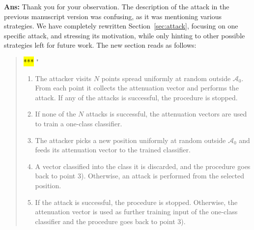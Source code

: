\documentclass[draftcls,onecolumn,12pt]{IEEEtran}
\newcounter{revc}
\newcommand{\revp}[1]{\zref[revcontent]{#1}}
\begin{document}
\begin{framed}
\end{framed}
{\bf Ans:}\label{MLattackissue} Thank you for your observation. The description of the attack in the previous manuscript version was confusing, as it was  mentioning various strategies. We have completely rewritten Section~\ref{sec:attack}, focusing on one specific attack, and stressing its motivation, while only hinting to other possible strategies left for future work. The new section reads as follows:
\begin{quote}
 \hl{***}   "\revp{sezattack}
\begin{enumerate}
    \item The attacker visits $N$  points spread uniformly at random outside $\mathcal A_0$. From each point it collects the attenuation vector and performs the attack. If any of the attacks is successful, the procedure is stopped.
    \item If none of the $N$ attacks is successful, the attenuation vectors are used to train a one-class classifier.
    \item The attacker picks a new position uniformly at random outside $\mathcal A_0$ and feeds its attenuation vector to the trained classifier.
    \item A vector classified into the class it is discarded, and the procedure goes back to point 3). Otherwise, an attack is performed from the selected position.
    \item If the attack is successful, the procedure is stopped. Otherwise, the attenuation vector is used as further training input of the one-class classifier and the procedure goes back to point 3).
\end{enumerate}
\revp{sezattack2} 
\end{quote}


\vspace{5mm} %
\begin{framed}
\end{framed}
\end{document}
